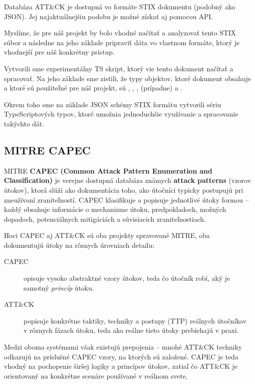 \documentclass[11pt]{article}
\begin{document}
Databáza ATT\&CK je dostupná vo formáte STIX dokumentu (podobný ako JSON). Jej najaktuálnejšiu podobu je možné získať aj pomocou API.

Myslíme, že pre náš projekt by bolo vhodné načítať a analyzovať tento STIX súbor a následne na jeho základe pripraviť dáta vo vlastnom formáte, ktorý je vhodnejší pre náš konkrétny prístup.

Vytvorili sme experimentálny TS skript, ktorý vie tento dokument načítať a spracovať. Na jeho základe sme zistili, že typy objektov, ktoré dokument obsahuje a ktoré sú použiteľné pre náš projekt, sú , , ,  (prípadne) a .

Okrem toho sme na základe JSON schémy STIX formátu vytvorili sériu TypeScriptových typov, ktoré umožnia jednoduchšie využívanie a spracovanie takýchto dát.

\subsection{MITRE CAPEC}
MITRE \textbf{CAPEC (Common Attack Pattern Enumeration and Classification)} je verejne dostupná databáza známych \textbf{attack patterns} (vzorov útokov), ktorá slúži ako dokumentácia toho, ako útočníci typicky postupujú pri zneužívaní zraniteľností. CAPEC klasifikuje a popisuje jednotlivé útoky formou  -- každý obsahuje informácie o mechanizme útoku, predpokladoch, možných dopadoch, potenciálnych mitigáciách a súvisiacich zraniteľnostiach.

Hoci CAPEC aj ATT\&CK sú oba projekty spravované MITRE, oba dokumentujú útoky na rôznych úrovniach detailu:
\begin{description}
    \item[CAPEC] opisuje vysoko abstraktné vzory útokov, teda čo útočník robí, aký je samotný \emph{princíp} útoku.
    \item[ATT\&CK] popisuje konkrétne taktiky, techniky a postupy (TTP) reálnych útočníkov v rôznych fázach útoku, teda ako reálne tieto útoky prebiehajú v praxi.
\end{description}

Medzi oboma systémami však existujú prepojenia -- mnohé ATT\&CK techniky odkazujú na príslušné CAPEC vzory, na ktorých sú založené. CAPEC je teda vhodný na pochopenie širšej logiky a princípov útokov, zatiaľ čo ATT\&CK je orientovaný na konkrétne scenáre používané v reálnom svete.
\end{document}
